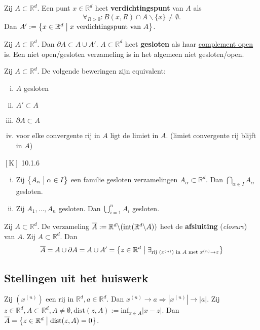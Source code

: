 \documentclass{2wa40summary}
\begin{document}
		 Zij $A \subset \mathbb{R}^d$. Een punt $x \in \mathbb{R}^d$ heet \textbf{verdichtingspunt} van $A$ als \[\forall _{R>0}:B(x,R)\cap  A \backslash\{x\} \neq \emptyset.\]
			Dan $A':=\big\{ x \in \mathbb{R}^d \bigm| x \text{ verdichtingspunt van } A\big\}$.
		
		\lemma Zij $A \subset \mathbb{R}^d$. Dan $\partial A \subset A\cup A'$.
		 $A \subset \mathbb{R}^d$ heet \textbf{gesloten} als haar \underline{complement open} is.
		\valkuil Een niet open/gesloten verzameling is in het algemeen niet gesloten/open.
		
		 Zij $A \subset \mathbb{R}^d$. De volgende beweringen zijn equivalent:
			\begin{enumerate}[(i)]
				\item $A$ gesloten
				\item $A'\subset A$
				\item $\partial A \subset A$
				\item voor elke convergente rij in $A$ ligt de limiet in $A$. (limiet convergente rij blijft in $A$)
			\end{enumerate}
		
		\theorem $\left[\text{K}\right]$ 10.1.6
			\begin{enumerate}[(i)]
				\item Zij $\big\{ A_\alpha \bigm| \alpha \in I \big\}$ een familie gesloten verzamelingen $A_\alpha \subset \mathbb{R}^d$. Dan $\bigcap_{\alpha \in I}A_\alpha$ gesloten.
				\item Zij $A_1, \dots ,A_n$ gesloten. Dan $\bigcup_{i=1}^n A_i$ gesloten.
			\end{enumerate}
		
		 Zij $A \subset \mathbb{R}^d$. De verzameling $\overline{A}:= \mathbb{R}^d \backslash (\operatorname{\mathop{int}} (\mathbb{R}^d \backslash A))$ heet de \textbf{afsluiting} (\textit{closure}) van $A$.
			  Zij $A \subset \mathbb{R}^d$. Dan
			\[\overline{A}= A \cup \partial A = A \cup A'= \big\{z \in \mathbb{R}^d \bigm| \exists _{\text{rij } (x^{(n)}) \text{ in } A \text{ met } x^{(n)} \rightarrow z} \big\}\]
	
	\subsection{Stellingen uit het huiswerk}
		\theorem Zij $(x^{(n)})$ een rij in $\mathbb{R}^d, a \in \mathbb{R}^d$. Dan $x^{(n)}\rightarrow a \Rightarrow |x^{(n)}|\rightarrow |a|.$
		\theorem Zij $z \in \mathbb{R}^d, A \subset \mathbb{R}^d, A \neq \emptyset, \text{dist}(z,A) := \text{inf}_{x\in A}|x-z|$.
		  Dan $\overline{A}=\big\{z\in \mathbb{R}^d \bigm| \text{dist}(z,A)=0\big\}$.
\newpage
\end{document}
